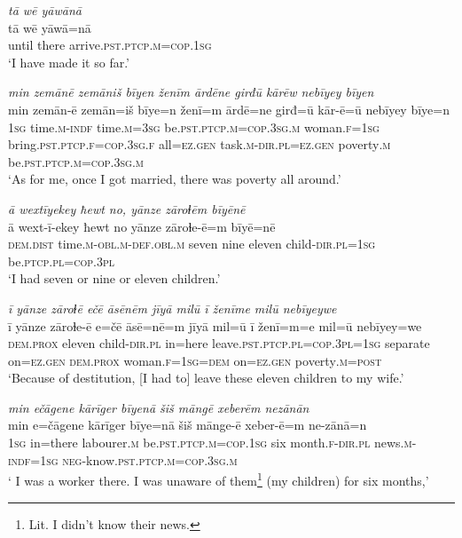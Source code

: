 \ea \label{ŽM.18}
\textit{tā wē yāwānā} \\ 
\gll tā wē yāwā=nā \\ 
 until there arrive\textsc{.pst}\textsc{.ptcp}\textsc{.m}\textsc{=cop}\textsc{.\textsc{1sg}} \\ 
\glt `I have made it so far.'
\z 
 
\ea \label{ŽM.20}
\textit{min zemānē zemāniš bīyen ženīm ārdēne girđū kārēw nebīyey bīyen} \\ 
\gll min zemān-ē zemān=iš bīye=n ženī=m ārdē=ne girđ=ū kār-ē=ū nebīyey bīye=n \\ 
 \textsc{1sg} time\textsc{.m}\textsc{-indf} time\textsc{.m}\textsc{=3sg} be\textsc{.pst}\textsc{.ptcp}\textsc{.m}\textsc{=cop}\textsc{.3sg}\textsc{.m} woman\textsc{.f}\textsc{=\textsc{1sg}} bring\textsc{.pst}\textsc{.ptcp}\textsc{.f}\textsc{=cop}\textsc{.3sg}\textsc{.f} all\textsc{=ez.gen} task\textsc{.m}\textsc{-dir}\textsc{.pl}\textsc{=ez.gen} poverty\textsc{.m} be\textsc{.pst}\textsc{.ptcp}\textsc{.m}\textsc{=cop}\textsc{.3sg}\textsc{.m} \\ 
\glt `As for me, once I got married, there was poverty all around.'
\z 
 
\ea \label{ŽM.26}
\textit{ā wextīyekey ħewt no, yānze zāroɫēm bīyēnē} \\ 
\gll ā wext-ī-ekey ħewt no yānze zāroɫe-ē=m bīyē=nē \\ 
 \textsc{dem.dist} time\textsc{.m}\textsc{-obl}\textsc{.m}\textsc{-def}\textsc{.obl}\textsc{.m} seven nine eleven child\textsc{-dir}\textsc{.pl}\textsc{=\textsc{1sg}} be\textsc{.ptcp}\textsc{.pl}\textsc{=cop}\textsc{.3pl} \\ 
\glt `I had seven or nine or eleven children.'
\z 
 
\ea \label{ŽM.27}
\textit{ī yānze zāroɫē ečē āsēnēm jīyā milū ī ženīme milū nebīyeywe} \\ 
\gll ī yānze zāroɫe-ē e=čē āsē=nē=m jīyā mil=ū ī ženī=m=e mil=ū nebīyey=we \\ 
 \textsc{dem.prox} eleven child\textsc{-dir}\textsc{.pl} in=here leave\textsc{.pst}\textsc{.ptcp}\textsc{.pl}\textsc{=cop}\textsc{.3pl}\textsc{=\textsc{1sg}} separate on\textsc{=ez.gen} \textsc{dem.prox} woman\textsc{.f}\textsc{=\textsc{1sg}}\textsc{=dem} on\textsc{=ez.gen} poverty\textsc{.m}\textsc{=\textsc{post}} \\ 
\glt `Because of destitution, [I had to] leave these eleven children to my wife.'
\z 
 
\ea \label{ŽM.28}
\textit{min ečāgene kārīger bīyenā šiš māngē xeberēm nezānān} \\ 
\gll min e=čāgene kārīger bīye=nā šiš mānge-ē xeber-ē=m ne-zānā=n \\ 
 \textsc{1sg} in=there labourer\textsc{.m} be\textsc{.pst}\textsc{.ptcp}\textsc{.m}\textsc{=cop}\textsc{.\textsc{1sg}} six month\textsc{.f}\textsc{-dir}\textsc{.pl} news\textsc{.m}\textsc{-indf}\textsc{=\textsc{1sg}} \textsc{neg-}know\textsc{.pst}\textsc{.ptcp}\textsc{.m}\textsc{=cop}\textsc{.3sg}\textsc{.m} \\ 
\glt ` I was a worker there. I was unaware of them\footnote{Lit. I didn’t know their news.}  (my children) for six months,'
\z 
 
